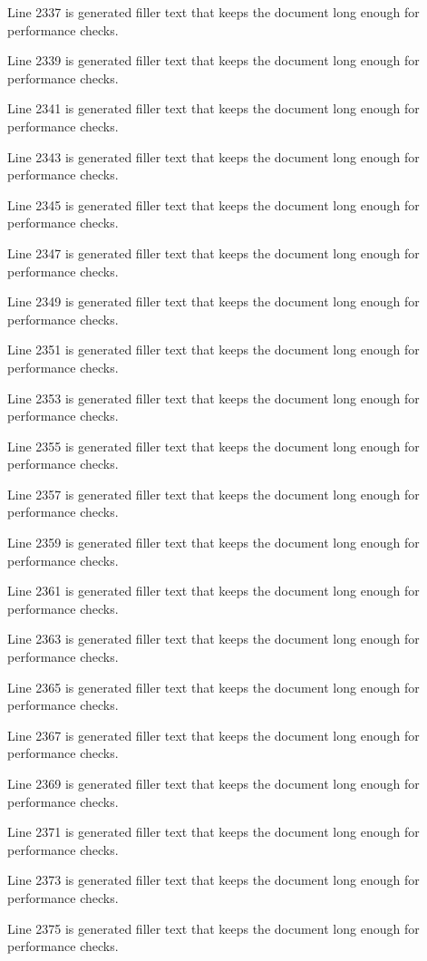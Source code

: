 Line 2337 is generated filler text that keeps the document long enough for performance checks.

Line 2339 is generated filler text that keeps the document long enough for performance checks.

Line 2341 is generated filler text that keeps the document long enough for performance checks.

Line 2343 is generated filler text that keeps the document long enough for performance checks.

Line 2345 is generated filler text that keeps the document long enough for performance checks.

Line 2347 is generated filler text that keeps the document long enough for performance checks.

Line 2349 is generated filler text that keeps the document long enough for performance checks.

Line 2351 is generated filler text that keeps the document long enough for performance checks.

Line 2353 is generated filler text that keeps the document long enough for performance checks.

Line 2355 is generated filler text that keeps the document long enough for performance checks.

Line 2357 is generated filler text that keeps the document long enough for performance checks.

Line 2359 is generated filler text that keeps the document long enough for performance checks.

Line 2361 is generated filler text that keeps the document long enough for performance checks.

Line 2363 is generated filler text that keeps the document long enough for performance checks.

Line 2365 is generated filler text that keeps the document long enough for performance checks.

Line 2367 is generated filler text that keeps the document long enough for performance checks.

Line 2369 is generated filler text that keeps the document long enough for performance checks.

Line 2371 is generated filler text that keeps the document long enough for performance checks.

Line 2373 is generated filler text that keeps the document long enough for performance checks.

Line 2375 is generated filler text that keeps the document long enough for performance checks.

